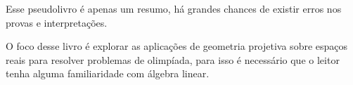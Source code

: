 Esse pseudolivro é apenas um resumo, há grandes chances de existir erros nos provas e interpretações.

O foco desse livro é explorar as aplicações de geometria projetiva sobre espaços reais para resolver problemas de olimpíada, para isso é necessário que o leitor tenha alguma familiaridade com álgebra linear.